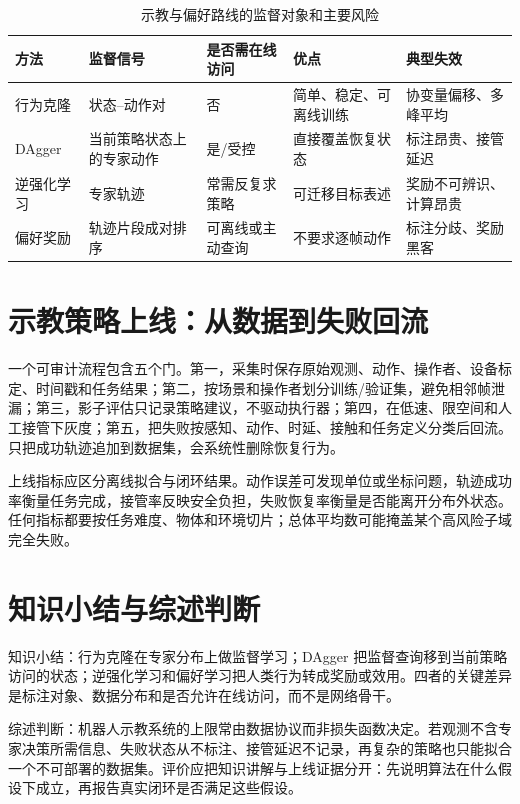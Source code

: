 \begin{table}[H]
\centering
\caption{示教与偏好路线的监督对象和主要风险}
\label{tab:imitation-preference-comparison}
\begin{tabularx}{\textwidth}{p{}YYYY}
\toprule
方法 & 监督信号 & 是否需在线访问 & 优点 & 典型失效 \\
\midrule
行为克隆 & 状态--动作对 & 否 & 简单、稳定、可离线训练 & 协变量偏移、多峰平均 \\
DAgger & 当前策略状态上的专家动作 & 是/受控 & 直接覆盖恢复状态 & 标注昂贵、接管延迟 \\
逆强化学习 & 专家轨迹 & 常需反复求策略 & 可迁移目标表述 & 奖励不可辨识、计算昂贵 \\
偏好奖励 & 轨迹片段成对排序 & 可离线或主动查询 & 不要求逐帧动作 & 标注分歧、奖励黑客 \\
\bottomrule
\end{tabularx}
\end{table}

\section{示教策略上线：从数据到失败回流}

一个可审计流程包含五个门。第一，采集时保存原始观测、动作、操作者、设备标定、时间戳和任务结果；第二，按场景和操作者划分训练/验证集，避免相邻帧泄漏；第三，影子评估只记录策略建议，不驱动执行器；第四，在低速、限空间和人工接管下灰度；第五，把失败按感知、动作、时延、接触和任务定义分类后回流。只把成功轨迹追加到数据集，会系统性删除恢复行为。

上线指标应区分离线拟合与闭环结果。动作误差可发现单位或坐标问题，轨迹成功率衡量任务完成，接管率反映安全负担，失败恢复率衡量是否能离开分布外状态。任何指标都要按任务难度、物体和环境切片；总体平均数可能掩盖某个高风险子域完全失败。

\section{知识小结与综述判断}

知识小结：行为克隆在专家分布上做监督学习；DAgger 把监督查询移到当前策略访问的状态；逆强化学习和偏好学习把人类行为转成奖励或效用。四者的关键差异是标注对象、数据分布和是否允许在线访问，而不是网络骨干。

综述判断：机器人示教系统的上限常由数据协议而非损失函数决定。若观测不含专家决策所需信息、失败状态从不标注、接管延迟不记录，再复杂的策略也只能拟合一个不可部署的数据集。评价应把知识讲解与上线证据分开：先说明算法在什么假设下成立，再报告真实闭环是否满足这些假设。
